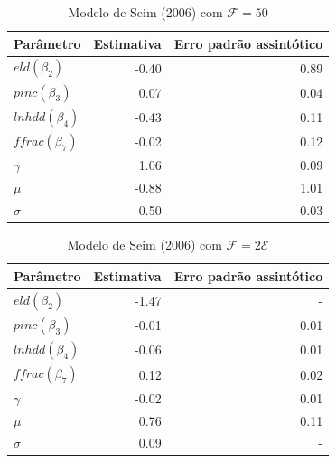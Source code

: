 \documentclass{article}
\begin{document}
\begin{table}[H]
    \centering
\begin{tabular}{lrr}
\hline
 Parâmetro & Estimativa & Erro padrão assintótico\\
\hline
$eld (\beta_2)$ & -0.40 & 0.89\\
$pinc (\beta_3)$ & 0.07 & 0.04\\
$lnhdd (\beta_4)$ & -0.43 & 0.11\\
$ffrac (\beta_7)$ & -0.02 & 0.12\\
$\gamma$ & 1.06 & 0.09\\
$\mu$ &-0.88 & 1.01\\
$\sigma$ &0.50 & 0.03\\
\hline
\end{tabular}
    \caption{Modelo de Seim (2006) com $\mathcal{F}=50$}
    \label{f50}
\end{table}

\begin{table}[H]
    \centering
\begin{tabular}{lrr}
\hline
 Parâmetro & Estimativa & Erro padrão assintótico\\
\hline
$eld (\beta_2)$ &-1.47 & -\\
$pinc (\beta_3)$ & -0.01 & 0.01 \\
$lnhdd (\beta_4)$ & -0.06 & 0.01\\
$ffrac (\beta_7)$ & 0.12 & 0.02 \\
$\gamma$ & -0.02 & 0.01 \\
$\mu$ &0.76 & 0.11 \\
$\sigma$ & 0.09 & -\\
\hline
\end{tabular}
    \caption{Modelo de Seim (2006) com $\mathcal{F}=2\mathcal{E}$}
    \label{f2n}
\end{table}
\end{document}
